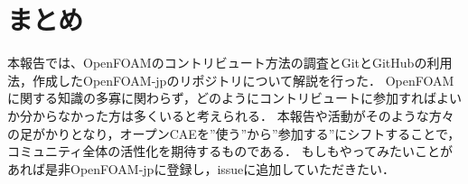 \documentclass{ltjoc}
\begin{document}
\section{まとめ}
本報告では、OpenFOAMのコントリビュート方法の調査とGitとGitHubの利用法，作成したOpenFOAM-jpのリポジトリについて解説を行った．
OpenFOAMに関する知識の多寡に関わらず，どのようにコントリビュートに参加すればよいか分からなかった方は多くいると考えられる．
本報告や活動がそのような方々の足がかりとなり，オープンCAEを”使う”から”参加する”にシフトすることで，
コミュニティ全体の活性化を期待するものである．
もしもやってみたいことがあれば是非OpenFOAM-jpに登録し，issueに追加していただきたい．

\end{document}

